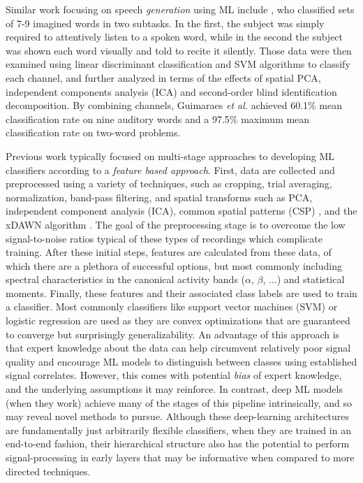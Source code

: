 \documentclass[utf8]{frontiersSCNS} %
\begin{document}

Similar work focusing on speech \emph{generation} using ML include \cite{Guimaraes2007}, who classified sets of 7-9 imagined words in two subtasks. In the first, the subject was simply required to attentively listen to a spoken word, while in the second the subject was shown each word visually and told to recite it silently. Those data were then examined using linear discriminant classification and SVM algorithms to classify each channel, and further analyzed in terms of the effects of spatial PCA, independent components analysis (ICA) and second-order blind identification decomposition. By combining channels, Guimaraes {\em et al.} achieved 60.1\% mean classification rate on nine auditory words and a 97.5\% maximum mean classification rate on two-word problems.


Previous work typically focused on multi-stage approaches to developing ML classifiers according to a \emph{feature based approach}. First, data are collected and preprocessed using a variety of techniques, such as cropping, trial averaging, normalization, band-pass filtering, and spatial transforms such as PCA, independent component analysis (ICA), common spatial patterns (CSP) \cite{Muller-Gerking1999}, and the xDAWN algorithm \cite{Rivet2009}. The goal of the preprocessing stage is to overcome the low signal-to-noise ratios typical of these types of recordings which complicate training. After these initial steps, features are calculated from these data, of which there are a plethora of successful options, but most commonly including spectral characteristics in the canonical activity bands ($\alpha$, $\beta$, ...) and statistical moments. Finally, these features and their associated class labels are used to train a classifier. Most commonly classifiers like support vector machines (SVM) or logistic regression are used as they are convex optimizations that are guaranteed to converge but surprisingly generalizability. An advantage of this approach is that expert knowledge about the data can help circumvent relatively poor signal quality and encourage ML models to distinguish between classes using established signal correlates. However, this comes with potential \emph{bias} of expert knowledge, and the underlying assumptions it may reinforce. In contrast, deep ML models (when they work) achieve many of the stages of this pipeline intrinsically, and so may reveal novel methods to pursue. Although these deep-learning architectures are fundamentally just arbitrarily flexible classifiers, when they are trained in an end-to-end fashion, their hierarchical structure also has the potential to perform signal-processing in early layers that may be informative when compared to more directed techniques.
\end{document}

